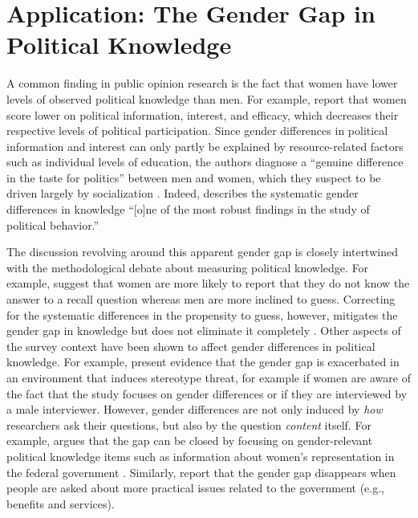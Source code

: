 \section{Application: The Gender Gap in Political Knowledge}

A common finding in public opinion research is the fact that women have lower levels of observed political knowledge than men. For example, \citet{verba1997knowing} report that women score lower on political information, interest, and efficacy, which decreases their respective levels of political participation. Since gender differences in political information and interest can only partly be explained by resource-related factors such as individual levels of education, the authors diagnose a ``genuine difference in the taste for politics'' between men and women, which they suspect to be driven largely by socialization \citep[see also][]{wolak2011roots}. Indeed, \citet[117]{dow2009gender} describes the systematic gender differences in knowledge ``[o]ne of the most robust findings in the study of political behavior.''

The discussion revolving around this apparent gender gap is closely intertwined with the methodological debate about measuring political knowledge. For example, \citet{mondak2004knowledge} suggest that women are more likely to report that they do not know the answer to a recall question whereas men are more inclined to guess. Correcting for the systematic differences in the propensity to guess, however, mitigates the gender gap in knowledge but does not eliminate it completely \citep[see also][]{lizotte2009explaining}. Other aspects of the survey context have been shown to affect gender differences in political knowledge. For example, \citet{mcglone2006stereotype} present evidence that the gender gap is exacerbated in an environment that induces stereotype threat, for example if women are aware of the fact that the study focuses on gender differences or if they are interviewed by a male interviewer. However, gender differences are not only induced by \textit{how} researchers ask their questions, but also by the question \textit{content} itself. For example, \citet{dolan2011women} argues that the gap can be closed by focusing on gender-relevant political knowledge items such as information about women's representation in the federal government \citep[see also][]{graber2001processing,fraile2014does,jerit2017revisiting}. Similarly, \citet{stolle2010women} report that the gender gap disappears when people are asked about more practical issues related to the government (e.g., benefits and services).

